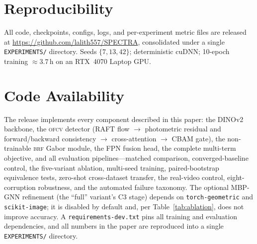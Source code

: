\documentclass[conference]{IEEEtran}
\newcommand{\ofcv}{\textsc{ofcv}}
\newcommand{\brf}{\textsc{brf}}
\newcommand{\dinov}{DINOv2}
\begin{document}
\section*{Reproducibility}
All code, checkpoints, configs, logs, and per-experiment metric files are
released at \url{https://github.com/lalith557/SPECTRA}, consolidated under a
single \texttt{EXPERIMENTS/} directory.%
Seeds $\{7,13,42\}$; deterministic cuDNN; 10-epoch training ${\approx}3.7$\,h on
an RTX~4070 Laptop GPU.

\section*{Code Availability}
The release implements every component described in this paper: the \dinov{}
backbone, the \ofcv{} detector (RAFT flow $\rightarrow$ photometric residual and
forward/backward consistency $\rightarrow$ cross-attention $\rightarrow$ CBAM
gate), the non-trainable \brf{} Gabor module, the FPN fusion head, the complete
multi-term objective, and all evaluation pipelines---matched comparison,
converged-baseline control, the five-variant ablation, multi-seed training,
paired-bootstrap equivalence tests, zero-shot cross-dataset transfer, the
real-video control, eight-corruption robustness, and the automated failure
taxonomy. The optional MBP-GNN refinement (the ``full'' variant's C3 stage)
depends on \texttt{torch-geometric} and \texttt{scikit-image}; it is disabled by
default and, per Table~\ref{tab:ablation}, does not improve accuracy. A
\texttt{requirements-dev.txt} pins all training and evaluation dependencies, and
all numbers in the paper are reproduced into a single \texttt{EXPERIMENTS/}
directory.
\end{document}
